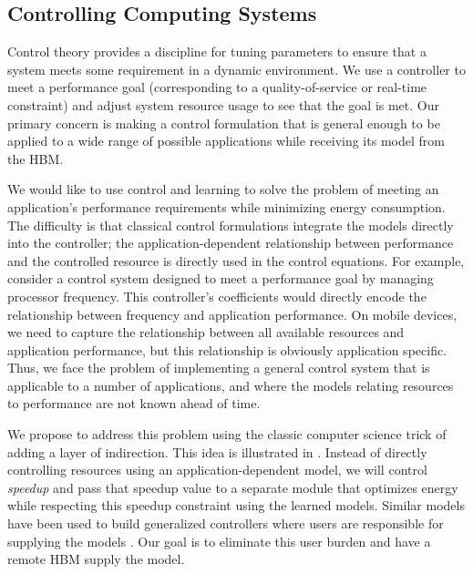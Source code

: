 
\subsection{Controlling Computing Systems}

Control theory provides a discipline for tuning parameters to ensure
that a system meets some requirement in a dynamic environment.  We use
a controller to meet a performance goal (corresponding to a
quality-of-service or real-time constraint) and adjust system resource
usage to see that the goal is met.  Our primary concern is making a
control formulation that is general enough to be applied to a wide
range of possible applications while receiving its model from the HBM.

We would like to use control and learning to solve the problem of
meeting an application's performance requirements while minimizing
energy consumption.  The difficulty is that classical control
formulations integrate the models directly into the controller; \ie
the application-dependent relationship between performance and the
controlled resource is directly used in the control equations.  For
example, consider a control system designed to meet a performance goal
by managing processor frequency.  This controller's coefficients would
directly encode the relationship between frequency and application
performance.  On mobile devices, we need to capture the relationship
between all available resources and application performance, but this
relationship is obviously application specific.  Thus, we face the
problem of implementing a general control system that is applicable to
a number of applications, and where the models relating resources to
performance are not known ahead of time.

We propose to address this problem using the classic computer science
trick of adding a layer of indirection.  This idea is illustrated in
.  Instead of directly controlling resources using an
application-dependent model, we will control \emph{speedup} and pass
that speedup value to a separate module that optimizes energy while
respecting this speedup constraint using the learned models.  Similar
models have been used to build generalized controllers where users are
responsible for supplying the models \cite{POET}.  Our goal is to
eliminate this user burden and have a remote HBM supply the model.

